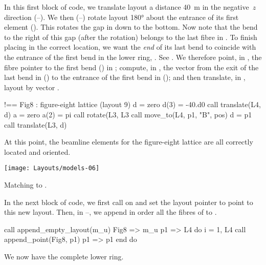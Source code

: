 %
In this first block of code, we translate layout  a
distance \SI{40}{m} in the negative~$z$ direction
(--).
We then (--) rotate layout
 \ang{180} about the entrance of its first element
(). This rotates the gap in 
down to the bottom. Now note that the bend to the right of this
gap (after the rotation) belongs to the last fibre in .
To finish placing  in the correct location, we want the
\emph{end} of its last bend to coincide with the entrance of the
first bend in the lower ring, . See .
We therefore point, in , the fibre pointer
 to the first bend () in ; compute, in
, the vector  from the exit of the last
bend in  () to the entrance of
the first bend in  (); and then
translate, in , layout  by vector .
%
\begin{ptccode}
!== Fig8 : figure-eight lattice (layout 9)
d = zero                                \label{lin:fig8.btr4}
d(3) = -40.d0
call translate(L4, d)                   \label{lin:fig8.etr4}
a = zero                                \label{lin:fig8.brot}
a(2) = pi
call rotate(L3, L3%
call move_to(L4, p1, "B", pos)          \label{lin:fig8.mvp1}
d = p1%
call translate(L3, d)                   \label{lin:fig8.tr3}
\end{ptccode}
%
At this point, the beamline elements for the figure-eight lattice
are all correctly located and oriented.

\begin{MarginFigure}[-29\baselineskip]\forceversofloat
  \texttt{[image: Layouts/models-06]}
  \caption{Matching  to .}
  \label{fig:ring.match}
\end{MarginFigure}

%
In the next block of code, we first call 
on  and set the layout pointer  to point to this
new layout. Then, in --,
we append in order all the fibres of  to .
%
\begin{ptccode}
call append_empty_layout(m_u)
Fig8 => m_u%
p1 => L4%
do i = 1, L4%
  call append_point(Fig8, p1)
  p1 => p1%
end do                         \label{lin:fig8.eapp.L4}
\end{ptccode}
%
We now have the complete lower ring.


